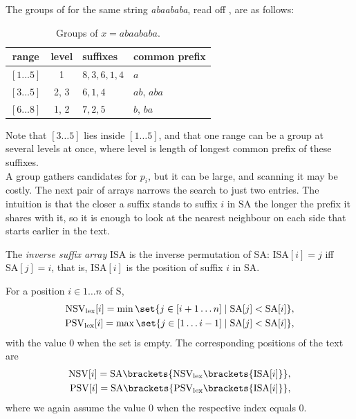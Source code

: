 \noindent The groups of  for the same string \emph{abaababa}, read off , are as follows:
\begin{table}[H]
    \centering
    \begin{tabular}{ccll}
        \toprule
        range & level & suffixes & common prefix \\
        \midrule
        \([1 \ldots 5]\) & 1     & \(8, 3, 6, 1, 4\) & \(a\) \\
        \([3 \ldots 5]\) & 2, 3  & \(6, 1, 4\)       & \(ab\), \(aba\) \\
        \([6 \ldots 8]\) & 1, 2  & \(7, 2, 5\)       & \(b\), \(ba\) \\
        \bottomrule
    \end{tabular}
    \caption{Groups of \(x = abaababa\).}
    \label{tab:groups}
\end{table}
\noindent Note that \([3 \ldots 5]\) lies inside \([1 \ldots 5]\), and that one range can be a group at several levels at once, where level is length of longest common prefix of these suffixes.
\\

A group gathers candidates for \(p_i\), but it can be large, and scanning it may be costly. The next pair of arrays narrows the search to just two entries. The intuition is that the closer a suffix stands to suffix \(i\) in \(\mathrm{SA}\) the longer the prefix it shares with it, so it is enough to look at the nearest neighbour on each side that starts earlier in the text.
\begin{definition}
\label{def:isa}
    The \emph{inverse suffix array} \(\mathrm{ISA}\) is the inverse permutation of \(\mathrm{SA}\): \(\mathrm{ISA}[i] = j\) iff \(\mathrm{SA}[j] = i\), that is, \(\mathrm{ISA}[i]\) is the position of suffix \(i\) in \(\mathrm{SA}\).
\end{definition}

\begin{definition}
\label{def:nsv-psv}
    For a position \(i \in 1 \ldots n\) of \(\mathrm{S}\),
    \begin{align*}
        \mathrm{NSV}_{\mathrm{lex}}[i] = \min \set{ j \in [i+1 \ldots n] \mid \mathrm{SA}[j] < \mathrm{SA}[i] }, \\
        \mathrm{PSV}_{\mathrm{lex}}[i] = \max \set{ j \in [1 \ldots i-1] \mid \mathrm{SA}[j] < \mathrm{SA}[i] },
    \end{align*}
    with the value \(0\) when the set is empty. The corresponding positions of the text are
    \begin{align*}
        \mathrm{NSV}[i] = \mathrm{SA}\brackets{ \mathrm{NSV}_{\mathrm{lex}}\brackets{\mathrm{ISA}[i]} },\\
        \mathrm{PSV}[i] = \mathrm{SA}\brackets{ \mathrm{PSV}_{\mathrm{lex}}\brackets{\mathrm{ISA}[i]} },
    \end{align*}
    where we again assume the value \(0\) when the respective index equals \(0\).
\end{definition}

